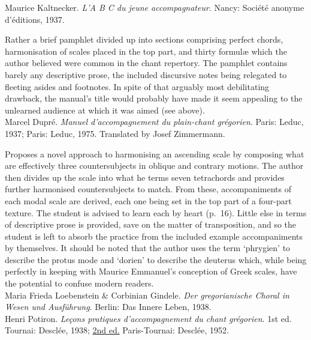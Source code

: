     \parindent=0pt
    \hangindent=0pt
  Maurice Kaltnecker. \emph{L'A B C du jeune accompagnateur}. Nancy:  Société anonyme d'éditions, 1937.

     \parindent=20pt
     \hangindent=20pt
     Rather a brief pamphlet divided up into sections comprising perfect chords, harmonisation of scales placed in the top part, and thirty formul\ae{} which the author believed were common in the chant repertory. The pamphlet contains barely any descriptive prose, the included discursive notes being relegated to fleeting asides and footnotes. In spite of that arguably most debilitating drawback, the manual's title would probably have made it seem appealing to the unlearned audience at which it was aimed (see  above).\\

    \parindent=0pt
    \hangindent=0pt
  Marcel Dupré. \emph{Manuel d'accompagnement du plain-chant grégorien}. Paris:  Leduc, 1937;  Paris:  Leduc, 1975. Translated by Josef Zimmermann.

     \parindent=20pt
     \hangindent=20pt
     Proposes a novel approach to harmonising an ascending scale by composing what are effectively three countersubjects in oblique and contrary motions. The author then divides up the scale into what he terms seven tetrachords and provides further harmonised countersubjects to match. From these, accompaniments of each modal scale are derived, each one being set in the top part of a four-part texture. The student is advised to learn each by heart (p.~16). Little else in terms of descriptive prose is provided, save on the matter of transposition, and so the student is left to absorb the practice from the included example accompaniments by themselves. It should be noted that the author uses the term `phrygien' to describe the protus mode and `dorien' to describe the deuterus which, while being perfectly in keeping with Maurice Emmanuel's conception of Greek scales, have the potential to confuse modern readers.\\

    \parindent=0pt
    \hangindent=0pt
  \covid{}Maria Frieda Loebenstein \& Corbinian Gindele. \emph{Der gregorianische Choral in Wesen und Ausführung}. Berlin:  Das Innere Leben, 1938. \\

    \parindent=0pt
    \hangindent=0pt
  Henri Potiron. \emph{Leçons pratiques d'accompagnement du chant grégorien}. 1st ed. Tournai:  Desclée, 1938;  \underline{2nd ed.} Paris-Tournai:  Desclée, 1952.

